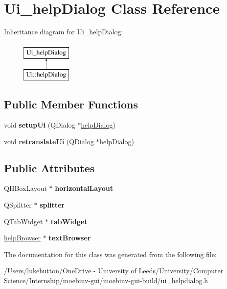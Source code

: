 \hypertarget{class_ui__help_dialog}{}\section{Ui\+\_\+help\+Dialog Class Reference}
\label{class_ui__help_dialog}
Inheritance diagram for Ui\+\_\+help\+Dialog\+:\begin{figure}[H]
\begin{center}
\leavevmode
\includegraphics[height=2.000000cm]{class_ui__help_dialog}
\end{center}
\end{figure}
\subsection*{Public Member Functions}
\begin{DoxyCompactItemize}
\item 
\mbox{\label{class_ui__help_dialog_a4074ac03760c68b2a4d9ba5e9aa47f4b}} 
void {\bfseries setup\+Ui} (Q\+Dialog $\ast$\mbox{\hyperlink{classhelp_dialog}{help\+Dialog}})
\item 
\mbox{\label{class_ui__help_dialog_a2f67a7a9b16bb22a264d312234c7e60d}} 
void {\bfseries retranslate\+Ui} (Q\+Dialog $\ast$\mbox{\hyperlink{classhelp_dialog}{help\+Dialog}})
\end{DoxyCompactItemize}
\subsection*{Public Attributes}
\begin{DoxyCompactItemize}
\item 
\mbox{\label{class_ui__help_dialog_a9a2ecc710af91e4b1e89a3d49e5a22c0}} 
Q\+H\+Box\+Layout $\ast$ {\bfseries horizontal\+Layout}
\item 
\mbox{\label{class_ui__help_dialog_a72aa819f279809b1c253f46bd2cec5dc}} 
Q\+Splitter $\ast$ {\bfseries splitter}
\item 
\mbox{\label{class_ui__help_dialog_a0c873833046066c8d4594e59905ad8d5}} 
Q\+Tab\+Widget $\ast$ {\bfseries tab\+Widget}
\item 
\mbox{\label{class_ui__help_dialog_ac04b5a0ba104077649c97b8ab07afc65}} 
\mbox{\hyperlink{classhelp_browser}{help\+Browser}} $\ast$ {\bfseries text\+Browser}
\end{DoxyCompactItemize}


The documentation for this class was generated from the following file\+:\begin{DoxyCompactItemize}
\item 
/\+Users/lukehutton/\+One\+Drive -\/ University of Leeds/\+University/\+Computer Science/\+Internship/moebinv-\/gui/moebinv-\/gui-\/build/ui\+\_\+helpdialog.\+h\end{DoxyCompactItemize}
